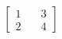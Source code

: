 \documentclass[preview]{standalone}
\begin{document}
\begin{align*}
\begin{bmatrix} 1 & \quad 3 \\ 2 & \quad 4 \end{bmatrix}
\end{align*}
\end{document}
